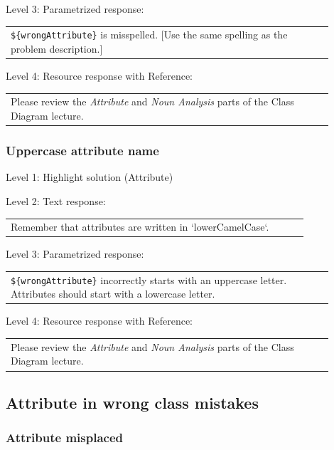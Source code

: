 \noindent Level 3: Parametrized response: \medskip

\begin{tabular}{|p{0.9\linewidth}}
\verb|${wrongAttribute}| is misspelled. [Use the same spelling as the problem description.]
\end{tabular} \medskip

\noindent Level 4: Resource response with Reference: \medskip

\begin{tabular}{|p{0.9\linewidth}}
Please review the \textit{Attribute} and \textit{Noun Analysis} parts of the Class Diagram lecture.
\end{tabular} \medskip


\subsubsection{Uppercase attribute name}

\noindent Level 1: Highlight solution (Attribute) \medskip

\noindent Level 2: Text response: \medskip

\begin{tabular}{|p{0.9\linewidth}}
Remember that attributes are written in `lowerCamelCase`.
\end{tabular} \medskip

\noindent Level 3: Parametrized response: \medskip

\begin{tabular}{|p{0.9\linewidth}}
\verb|${wrongAttribute}| incorrectly starts with an uppercase letter. Attributes should start with a lowercase letter.
\end{tabular} \medskip

\noindent Level 4: Resource response with Reference: \medskip

\begin{tabular}{|p{0.9\linewidth}}
Please review the \textit{Attribute} and \textit{Noun Analysis} parts of the Class Diagram lecture.
\end{tabular} \medskip


\subsection{Attribute in wrong class mistakes}

\subsubsection{Attribute misplaced}

